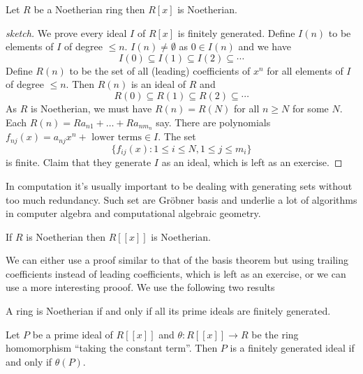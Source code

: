 \documentclass[a4paper]{article}
\begin{document}
\begin{theorem}
  Let \(R\) be a Noetherian ring then \(R[x]\) is Noetherian.
\end{theorem}

\begin{proof}[sketch]
  We prove every ideal \(I\) of \(R[x]\) is finitely generated. Define \(I(n)\) to be elements of \(I\) of degree \(\leq n\). \(I(n) \neq \emptyset\) as \(0 \in I(n)\) and we have
  \[
    I(0) \subseteq I(1) \subseteq I(2) \subseteq \cdots
  \]
  Define \(R(n)\) to be the set of all (leading) coefficients of \(x^n\) for all elements of \(I\) of degree \(\leq n\). Then \(R(n)\) is an ideal of \(R\) and
  \[
    R(0) \subseteq R(1) \subseteq R(2) \subseteq \cdots
  \]
  As \(R\) is Noetherian, we must have \(R(n) = R(N)\) for all \(n \geq N\) for some \(N\). Each \(R(n) = R a_{n1} + \dots + R a_{n m_n}\) say. There are polynomials \(f_{nj}(x) = a_{nj} x^n + \text{ lower terms} \in I\). The set
  \[
    \{f_{ij}(x): 1 \leq i \leq N, 1 \leq j \leq m_i\}
  \]
  is finite. Claim that they generate \(I\) as an ideal, which is left as an exercise.
\end{proof}

\begin{remark}
  In computation it's usually important to be dealing with generating sets without too much redundancy. Such set are Gröbner basis and underlie a lot of algorithms in computer algebra and computational algebraic geometry.
\end{remark}

\begin{theorem}
  If \(R\) is Noetherian then \(R[[x]]\) is Noetherian.
\end{theorem}

We can either use a proof similar to that of the basis theorem but using trailing coefficients instead of leading coefficients, which is left as an exercise, or we can use a more interesting prooof. We use the following two results

\begin{theorem}[Cohn]
  \label{thm:Cohn}
  A ring is Noetherian if and only if all its prime ideals are finitely generated. 
\end{theorem}

\begin{lemma}
  Let \(P\) be a prime ideal of \(R[[x]]\) and \(\theta: R[[x]] \to R\) be the ring homomorphism ``taking the constant term''. Then \(P\) is a finitely generated ideal if and only if \(\theta(P)\).
\end{lemma}
\end{document}
